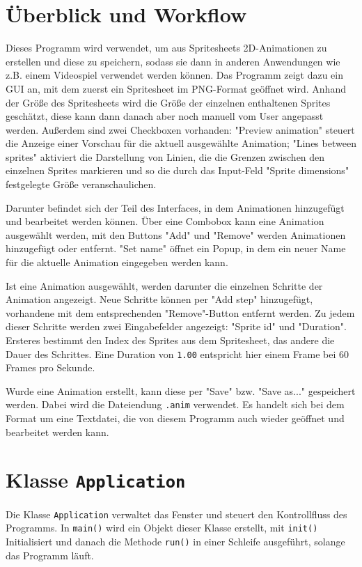 \chapter{Überblick und Workflow}
Dieses Programm wird verwendet, um aus Spritesheets 2D-Animationen zu erstellen und diese zu speichern, sodass sie dann in anderen Anwendungen wie z.B. einem Videospiel verwendet werden können. Das Programm zeigt dazu ein GUI an, mit dem zuerst ein Spritesheet im PNG-Format geöffnet wird. Anhand der Größe des Spritesheets wird die Größe der einzelnen enthaltenen Sprites geschätzt, diese kann dann danach aber noch manuell vom User angepasst werden. Außerdem sind zwei Checkboxen vorhanden: "Preview animation" steuert die Anzeige einer Vorschau für die aktuell ausgewählte Animation; "Lines between sprites" aktiviert die Darstellung von Linien, die die Grenzen zwischen den einzelnen Sprites markieren und so die durch das Input-Feld "Sprite dimensions" festgelegte Größe veranschaulichen.

Darunter befindet sich der Teil des Interfaces, in dem Animationen hinzugefügt und bearbeitet werden können. Über eine Combobox kann eine Animation ausgewählt werden, mit den Buttons "Add" und "Remove" werden Animationen hinzugefügt oder entfernt. "Set name" öffnet ein Popup, in dem ein neuer Name für die aktuelle Animation eingegeben werden kann.

Ist eine Animation ausgewählt, werden darunter die einzelnen Schritte der Animation angezeigt. Neue Schritte können per "Add step" hinzugefügt, vorhandene mit dem entsprechenden "Remove"-Button entfernt werden. Zu jedem dieser Schritte werden zwei Eingabefelder angezeigt: "Sprite id" und "Duration". Ersteres bestimmt den Index des Sprites aus dem Spritesheet, das andere die Dauer des Schrittes. Eine Duration von \lstinline{1.00} entspricht hier einem Frame bei 60 Frames pro Sekunde.

Wurde eine Animation erstellt, kann diese per "Save" bzw. "Save as..." gespeichert werden. Dabei wird die Dateiendung \lstinline{.anim} verwendet. Es handelt sich bei dem Format um eine Textdatei, die von diesem Programm auch wieder geöffnet und bearbeitet werden kann.



\chapter{Klasse \lstinline{Application}}
Die Klasse \lstinline{Application} verwaltet das Fenster und steuert den Kontrollfluss des Programms. In \lstinline{main()} wird ein Objekt dieser Klasse erstellt, mit \lstinline{init()} Initialisiert und danach die Methode \lstinline{run()} in einer Schleife ausgeführt, solange das Programm läuft.

